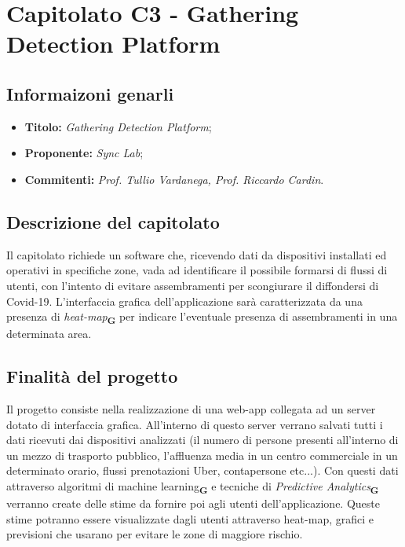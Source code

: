 \section{Capitolato C3 - Gathering Detection Platform}
\subsection{Informaizoni genarli}
\begin{itemize}
    \item \textbf{Titolo:} \textit{Gathering Detection Platform};
    \item \textbf{Proponente:} \textit{Sync Lab};
    \item \textbf{Commitenti:} \textit{Prof. Tullio Vardanega, Prof. Riccardo Cardin}.
\end{itemize}
\subsection{Descrizione del capitolato}
Il capitolato richiede un software che, ricevendo dati da dispositivi installati ed operativi in specifiche zone,
vada ad identificare il possibile formarsi di flussi di utenti, con l'intento di evitare assembramenti per scongiurare il diffondersi di Covid-19.
L'interfaccia grafica dell'applicazione sarà caratterizzata da una presenza di \textit{heat-map}\textsubscript{\textbf{G}} per indicare l'eventuale presenza di assembramenti in una determinata area.
\subsection{Finalità del progetto}
Il progetto consiste nella realizzazione di una web-app collegata ad un server dotato di interfaccia grafica. All'interno di questo server verrano salvati tutti i dati ricevuti dai dispositivi analizzati
(il numero di persone presenti all'interno di un mezzo di trasporto pubblico, l'affluenza media in un centro commerciale in un determinato orario, flussi prenotazioni Uber, contapersone etc...).
Con questi dati attraverso algoritmi di machine learning\textsubscript{\textbf{G}} e tecniche di \textit{Predictive Analytics}\textsubscript{\textbf{G}} verranno create delle stime da fornire poi agli utenti dell'applicazione.
Queste stime potranno essere visualizzate dagli utenti attraverso heat-map, grafici e previsioni che usarano per evitare le zone di maggiore rischio.
